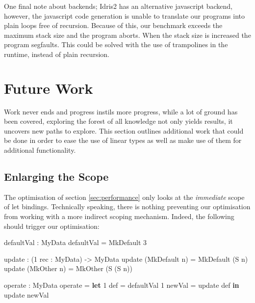 \documentclass[
]{article}
\newenvironment{Shaded}{}{}
\newcommand{\DataTypeTok}[1]{\textcolor[rgb]{0.56,0.13,0.00}{#1}}
\newcommand{\DecValTok}[1]{\textcolor[rgb]{0.25,0.63,0.44}{#1}}
\newcommand{\KeywordTok}[1]{\textcolor[rgb]{0.00,0.44,0.13}{\textbf{#1}}}
\newcommand{\NormalTok}[1]{#1}
\newcommand{\OperatorTok}[1]{\textcolor[rgb]{0.40,0.40,0.40}{#1}}
\newcommand{\OtherTok}[1]{\textcolor[rgb]{0.00,0.44,0.13}{#1}}
\begin{document}
One final note about backends; Idris2 has an alternative javascript
backend, however, the javascript code generation is unable to translate
our programs into plain loops free of recursion. Because of this, our
benchmark exceeds the maximum stack size and the program aborts. When
the stack size is increased the program segfaults. This could be solved
with the use of trampolines in the runtime, instead of plain recursion.

\newpage

\hypertarget{future-work}{%
\section{Future Work}\label{future-work}}

\label{sec:future-work}

Work never ends and progress instils more progress, while a lot of
ground has been covered, exploring the forest of all knowledge not only
yields results, it uncovers new paths to explore. This section outlines
additional work that could be done in order to ease the use of linear
types as well as make use of them for additional functionality.

\hypertarget{enlarging-the-scope}{%
\subsection{Enlarging the Scope}\label{enlarging-the-scope}}

The optimisation of section \ref{sec:performance} only looks at the
\emph{immediate} scope of let bindings. Technically speaking, there is
nothing preventing our optimisation from working with a more indirect
scoping mechanism. Indeed, the following should trigger our
optimisation:

\begin{Shaded}
\begin{Highlighting}[]
\NormalTok{defaultVal }\OperatorTok{:} \DataTypeTok{MyData}
\NormalTok{defaultVal }\OtherTok{=} \DataTypeTok{MkDefault} \DecValTok{3}

\NormalTok{update }\OperatorTok{:}\NormalTok{ (}\DecValTok{1}\NormalTok{ rec }\OperatorTok{:} \DataTypeTok{MyData}\NormalTok{) }\OtherTok{{-}\textgreater{}} \DataTypeTok{MyData}
\NormalTok{update (}\DataTypeTok{MkDefault}\NormalTok{ n) }\OtherTok{=} \DataTypeTok{MkDefault}\NormalTok{ (}\DataTypeTok{S}\NormalTok{ n)}
\NormalTok{update (}\DataTypeTok{MkOther}\NormalTok{ n) }\OtherTok{=} \DataTypeTok{MkOther}\NormalTok{ (}\DataTypeTok{S}\NormalTok{ (}\DataTypeTok{S}\NormalTok{ n))}

\NormalTok{operate }\OperatorTok{:} \DataTypeTok{MyData}
\NormalTok{operate }\OtherTok{=} \KeywordTok{let} \DecValTok{1}\NormalTok{ def }\OtherTok{=}\NormalTok{ defaultVal}
              \DecValTok{1}\NormalTok{ newVal }\OtherTok{=}\NormalTok{ update def }\KeywordTok{in}
\NormalTok{              update newVal}
\end{Highlighting}
\end{Shaded}
\end{document}
